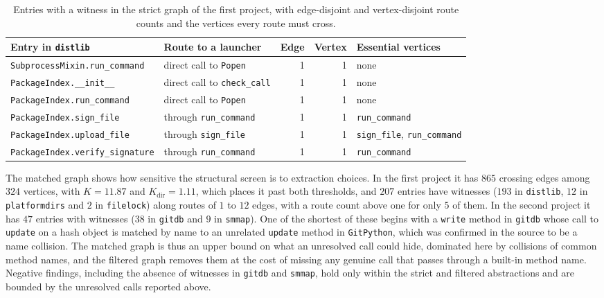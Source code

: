 \documentclass[11pt]{article}
\begin{document}
\begin{table}[h]
\centering
\small
\begin{tabular}{p{4.6cm}p{4.2cm}rrp{3.4cm}}
\hline
Entry in \texttt{distlib} & Route to a launcher & Edge & Vertex & Essential vertices \\
\hline
\texttt{SubprocessMixin.run\_command} & direct call to \texttt{Popen} & 1 & 1 & none \\
\texttt{PackageIndex.\_\_init\_\_} & direct call to \texttt{check\_call} & 1 & 1 & none \\
\texttt{PackageIndex.run\_command} & direct call to \texttt{Popen} & 1 & 1 & none \\
\texttt{PackageIndex.sign\_file} & through \texttt{run\_command} & 1 & 1 & \texttt{run\_command} \\
\texttt{PackageIndex.upload\_file} & through \texttt{sign\_file} & 1 & 1 & \texttt{sign\_file}, \texttt{run\_command} \\
\texttt{PackageIndex.verify\_signature} & through \texttt{run\_command} & 1 & 1 & \texttt{run\_command} \\
\hline
\end{tabular}
\caption{Entries with a witness in the strict graph of the first project, with edge-disjoint and vertex-disjoint route counts and the vertices every route must cross.}
\label{tab:pilot}
\end{table}

The matched graph shows how sensitive the structural screen is to extraction choices. In the first project it has $865$ crossing edges among $324$ vertices, with $K=11.87$ and $K_{\mathrm{dir}}=1.11$, which places it past both thresholds, and $207$ entries have witnesses ($193$ in \texttt{distlib}, $12$ in \texttt{platformdirs} and $2$ in \texttt{filelock}) along routes of $1$ to $12$ edges, with a route count above one for only $5$ of them. In the second project it has $47$ entries with witnesses ($38$ in \texttt{gitdb} and $9$ in \texttt{smmap}). One of the shortest of these begins with a \texttt{write} method in \texttt{gitdb} whose call to \texttt{update} on a hash object is matched by name to an unrelated \texttt{update} method in \texttt{GitPython}, which was confirmed in the source to be a name collision. The matched graph is thus an upper bound on what an unresolved call could hide, dominated here by collisions of common method names, and the filtered graph removes them at the cost of missing any genuine call that passes through a built-in method name. Negative findings, including the absence of witnesses in \texttt{gitdb} and \texttt{smmap}, hold only within the strict and filtered abstractions and are bounded by the unresolved calls reported above.
\end{document}
